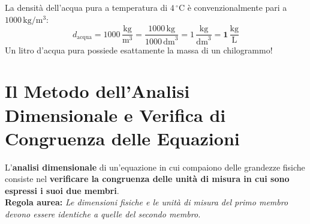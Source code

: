 \documentclass[11pt,a4paper,oneside]{report}
\begin{document}
\begin{commento}
La densit\`a dell'acqua pura a temperatura di $4\,^\circ\mathrm{C}$ \`e convenzionalmente pari a $1000\,\mathrm{kg/m^3}$:
\begin{equation}
    d_{\mathrm{acqua}} = 1000\,\frac{\mathrm{kg}}{\mathrm{m}^3} = \frac{1000\,\mathrm{kg}}{1000\,\mathrm{dm}^3} = 1\,\frac{\mathrm{kg}}{\mathrm{dm}^3} = \mathbf{1\,\frac{\mathrm{kg}}{\mathrm{L}}}
\end{equation}
Un litro d'acqua pura possiede esattamente la massa di un chilogrammo!
\end{commento}

\section{Il Metodo dell'Analisi Dimensionale e Verifica di Congruenza delle Equazioni}

\begin{definizione}
L'\textbf{analisi dimensionale} di un'equazione in cui compaiono delle grandezze fisiche consiste nel \textbf{verificare la congruenza delle unit\`a di misura in cui sono espressi i suoi due membri}.\\
\textbf{Regola aurea:} \textit{Le dimensioni fisiche e le unit\`a di misura del primo membro devono essere identiche a quelle del secondo membro.}
\end{definizione}
\end{document}
